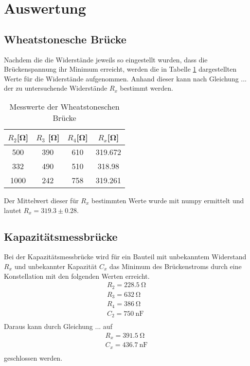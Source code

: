 \section{Auswertung}
\label{sec:Auswertung}

\subsection{Wheatstonesche Brücke}
  Nachdem die die Widerstände jeweils so eingestellt wurden, dass die Brückenspannung 
  ihr Minimum erreicht, werden die in Tabelle \ref{tab:some} dargestellten Werte für 
  die Widerstände aufgenommen. Anhand dieser kann nach Gleichung ... der zu untersuchende
  Widerstände $R_x$ bestimmt werden.
  \begin{table}[H]
    \centering
    \caption{Messwerte der Wheatstoneschen Brücke}
    \label{tab:some}
    \begin{tabular}{c c c c}
     \toprule
      $R_2 $[\si{\ohm}] & $R_3$ [\si{\ohm}] & $R_4 $[\si{\ohm}]& $R_x $[\si{\ohm}]\\
     \midrule
     500 & 390 & 610 & 319.672 \\
     332 & 490 & 510 & 318.98  \\
     1000 & 242 & 758 & 319.261 \\
     \bottomrule
    \end{tabular}
  \end{table} 
  Der Mittelwert dieser für $R_x$ bestimmten Werte wurde mit numpy ermittelt und lautet
  $R_x= 319.3 \pm 0.28$. 

\subsection{Kapazitätsmessbrücke}
  Bei der Kapazitätsmessbrücke wird für ein Bauteil mit unbekanntem Widerstand $R_x$
  und unbekannter Kapazität $C_x$ das Minimum des Brückenstroms durch eine Konstellation 
  mit den folgenden Werten erreicht.
  \begin{align*}
    R_2 = \SI{228.5}{\ohm}\\
    R_3 = \SI{632}{\ohm}\\
    R_4 = \SI{386}{\ohm}\\
    C_2 = \SI{750}{\nano\farad}\\
  \end{align*}
  Daraus kann durch Gleichung ... auf
  \begin{align*}
    R_x = \SI{391.5}{\ohm}\\
    C_x = \SI{436.7}{\nano\farad}\\
  \end{align*}
  geschlossen werden.

